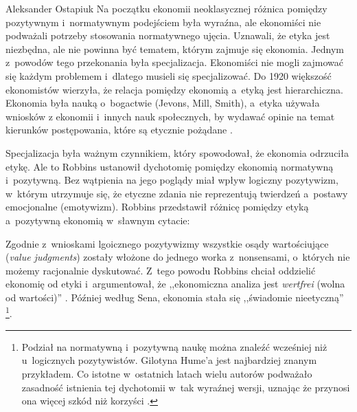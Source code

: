 \begin{artplenv}{Aleksander Ostapiuk}
Na początku ekonomii neoklasycznej różnica pomiędzy pozytywnym i~normatywnym podejściem była wyraźna, ale ekonomiści nie
podważali potrzeby stosowania normatywnego ujęcia. Uznawali, że etyka jest niezbędna, ale nie powinna być tematem,
którym zajmuje się ekonomia. Jednym z~powodów tego przekonania była specjalizacja. Ekonomiści nie mogli zajmować się
każdym problemem i~dlatego musieli się specjalizować. Do 1920 większość ekonomistów wierzyła, że relacja pomiędzy
ekonomią a~etyką jest hierarchiczna. Ekonomia była nauką o~bogactwie (Jevons, Mill, Smith), a~etyka używała wniosków z
ekonomii i~innych nauk społecznych, by wydawać opinie na temat kierunków postępowania, które są etycznie pożądane
\parencite{yuengert_positive-normative_2000}.

Specjalizacja była ważnym czynnikiem, który spowodował, że ekonomia odrzuciła etykę. Ale to Robbins ustanowił dychotomię
pomiędzy ekonomią normatywną i~pozytywną. Bez wątpienia na jego poglądy miał wpływ logiczny pozytywizm, w~którym
utrzymuje się, że etyczne zdania nie reprezentują twierdzeń a~postawy emocjonalne (emotywizm). Robbins
przedstawił różnicę pomiędzy etyką a~pozytywną ekonomią w~sławnym cytacie:


Zgodnie z~wnioskami lgoicznego pozytywizmy wszystkie osądy wartościujące (\textit{value judgments}) zostały włożone do
jednego worka z~nonsensami, o~których nie możemy racjonalnie dyskutować. Z~tego powodu Robbins chciał oddzielić
ekonomię od etyki i~argumentował, że ,,ekonomiczna analiza jest \textit{wertfrei }(wolna od wartości)''
\parencite[s.~91]{robbins_essay_1935}.
Później według Sena, ekonomia stała się ,,świadomie nieetyczną''
\parencite[s.~2]{sen_ethics_1987}\footnote{Podział na normatywną i~pozytywną naukę można znaleźć wcześniej niż
u~logicznych pozytywistów. Gilotyna Hume'a jest najbardziej znanym przykładem. Co istotne w~ostatnich latach wielu
autorów podważało zasadność istnienia tej dychotomii w~tak wyraźnej wersji, uznając że przynosi ona więcej szkód niż
korzyści
\parencite{blaug_metodologia_1995,putnam_collapse_2002,mongin_value_2006,czarny_pozytywizm_2010}.
}. 


\end{artplenv}
